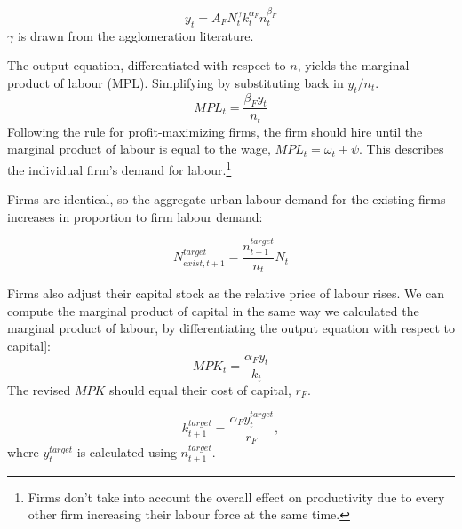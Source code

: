 \begin{equation}
    {y}_t= A_FN_t^\gamma k_t^{\alpha_F}n_t^{\beta_F} \label{eqn-urban-firm-output}
\end{equation}
$\gamma$ is drawn from the agglomeration literature.%

The output equation, differentiated with respect to  $n$, yields the marginal product of labour (MPL). Simplifying by substituting back in $y_t/n_t$. %
\begin{equation}MPL_{t} = \frac{\beta_{F}{y}_{t}} {n_t} \label{eqn-urban-firm-mpl}
\end{equation} 
Following the rule for profit-maximizing firms, the firm should hire until the marginal product of labour is equal to the wage, $MPL_t= {\omega_t + \psi}$. This describes the individual firm's demand  for labour.\footnote{Firms  don't take into account the overall effect on  productivity due to every other firm increasing their labour force at the same time. } 

Firms are identical, so the aggregate urban labour demand for  the existing firms increases in proportion to firm labour demand:

\begin{equation}N_{exist,t+1}^{target} = \frac{n^{target}_{t+1}}{n_{t}} N_t\end{equation}   


Firms also adjust their capital stock as the relative price of labour rises. We can compute the marginal product of capital in the same way we calculated the marginal product of labour, by differentiating the output equation with respect to capital]:
\begin{equation} MPK_t = \frac{\alpha_{F}{y}_{t}}{k_{t}} \label{eqn-urban-firm-mpk}
\end{equation} 
The revised $MPK$ should equal their cost of capital, $r_F$. %

\begin{equation}k_{t+1}^{target}= \frac{\alpha_{F}{y}^{target}_{t}}{r_F},\end{equation}
where  $y_t^{target}$  is calculated using $n^{target}_{t+1}$. %



